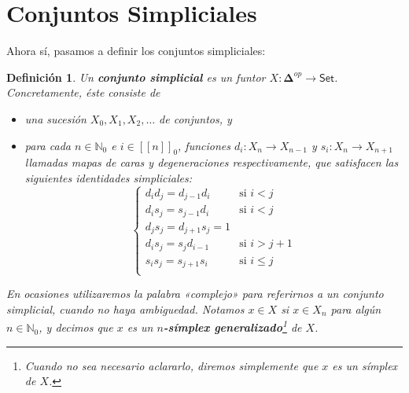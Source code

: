 \documentclass[11pt]{report}
\theoremstyle{colored}
\newtheorem{definition}{Definición}[section]
\newcommand{\N}{\mathbb{N}}
\newcommand{\nat}[1]{[\![#1]\!]}
\newcommand{\natzero}[1]{\nat{#1}_0}
\newcommand{\cat}[1]{\mathsf{#1}}
\newcommand{\ordcat}{\boldsymbol{\Delta}}
\newcommand{\guill}[1]{«#1»}
\begin{document}
\section{Conjuntos Simpliciales}

Ahora sí, pasamos a definir los conjuntos simpliciales:

\begin{definition} Un \textbf{conjunto simplicial} es un funtor $X : \ordcat^{op} \to \cat{Set}$. Concretamente, éste consiste de 
\begin{itemize}
\item[(i)] una sucesión $X_0,X_1,X_2, \dots$ de conjuntos, y \item[(ii)] para cada $n \in \N_0$ e $i \in \natzero{n}$, funciones 
$d_i : X_n \to X_{n-1}$ y $s_i : X_n \to X_{n+1}$ llamadas mapas de caras y degeneraciones respectivamente, que satisfacen las siguientes \textit{identidades simpliciales}:
\[
\begin{cases}
d_id_j = d_{j-1}d_i &\text{si $i < j$}\\
d_is_j = s_{j-1}d_i &\text{si $i < j$}\\
d_js_j = d_{j+1}s_j = 1\\
d_is_j = s_jd_{i-1} &\text{si $i > j+1$}\\
s_is_j = s_{j+1}s_i &\text{si $i \leq j$}\\
\end{cases}
\] 
\end{itemize}
En ocasiones utilizaremos la palabra \guill{complejo} para referirnos a un conjunto simplicial, cuando no haya ambiguedad. Notamos $x \in X$ si $x \in X_n$ para algún $n \in \N_0$, y decimos que $x$ es un \textbf{$n$-símplex generalizado}\footnote{Cuando no sea necesario aclararlo, diremos simplemente que $x$ es un símplex de $X$.} de $X$.\\
\end{definition}
\end{document}
